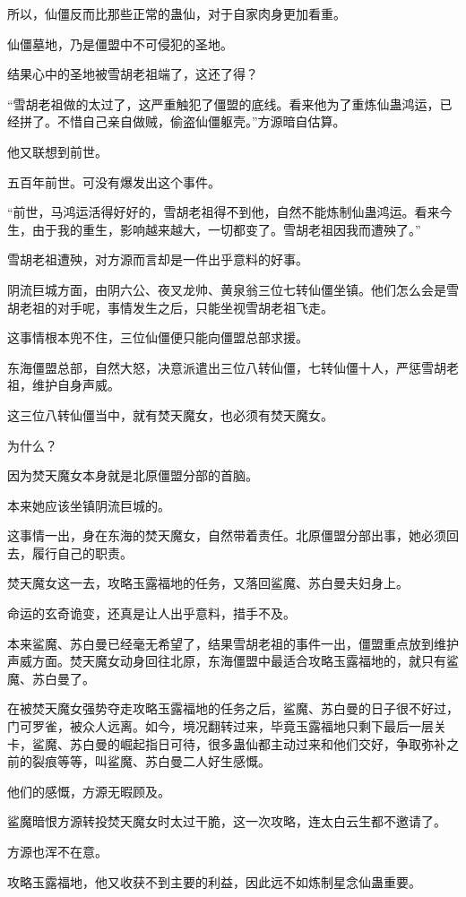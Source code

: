 \begin{this_body}
所以，仙僵反而比那些正常的蛊仙，对于自家肉身更加看重。

仙僵墓地，乃是僵盟中不可侵犯的圣地。

结果心中的圣地被雪胡老祖端了，这还了得？

“雪胡老祖做的太过了，这严重触犯了僵盟的底线。看来他为了重炼仙蛊鸿运，已经拼了。不惜自己亲自做贼，偷盗仙僵躯壳。”方源暗自估算。

他又联想到前世。

五百年前世。可没有爆发出这个事件。

“前世，马鸿运活得好好的，雪胡老祖得不到他，自然不能炼制仙蛊鸿运。看来今生，由于我的重生，影响越来越大，一切都变了。雪胡老祖因我而遭殃了。”

雪胡老祖遭殃，对方源而言却是一件出乎意料的好事。

阴流巨城方面，由阴六公、夜叉龙帅、黄泉翁三位七转仙僵坐镇。他们怎么会是雪胡老祖的对手呢，事情发生之后，只能坐视雪胡老祖飞走。

这事情根本兜不住，三位仙僵便只能向僵盟总部求援。

东海僵盟总部，自然大怒，决意派遣出三位八转仙僵，七转仙僵十人，严惩雪胡老祖，维护自身声威。

这三位八转仙僵当中，就有焚天魔女，也必须有焚天魔女。

为什么？

因为焚天魔女本身就是北原僵盟分部的首脑。

本来她应该坐镇阴流巨城的。

这事情一出，身在东海的焚天魔女，自然带着责任。北原僵盟分部出事，她必须回去，履行自己的职责。

焚天魔女这一去，攻略玉露福地的任务，又落回鲨魔、苏白曼夫妇身上。

命运的玄奇诡变，还真是让人出乎意料，措手不及。

本来鲨魔、苏白曼已经毫无希望了，结果雪胡老祖的事件一出，僵盟重点放到维护声威方面。焚天魔女动身回往北原，东海僵盟中最适合攻略玉露福地的，就只有鲨魔、苏白曼了。

在被焚天魔女强势夺走攻略玉露福地的任务之后，鲨魔、苏白曼的日子很不好过，门可罗雀，被众人远离。如今，境况翻转过来，毕竟玉露福地只剩下最后一层关卡，鲨魔、苏白曼的崛起指日可待，很多蛊仙都主动过来和他们交好，争取弥补之前的裂痕等等，叫鲨魔、苏白曼二人好生感慨。

他们的感慨，方源无暇顾及。

鲨魔暗恨方源转投焚天魔女时太过干脆，这一次攻略，连太白云生都不邀请了。

方源也浑不在意。

攻略玉露福地，他又收获不到主要的利益，因此远不如炼制星念仙蛊重要。


\end{this_body}
